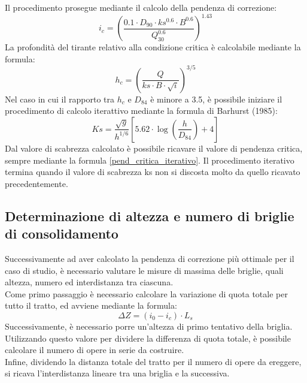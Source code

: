 Il procedimento prosegue mediante il calcolo della pendenza di correzione:
\begin{equation}
    i_c = \left(\frac{0.1 \cdot D_{90} \cdot ks^{0.6} \cdot B^{0.6}}{Q^{0.6}_{30}} \right) ^{1.43}
    \label{pend_critica_iterativo}
\end{equation}
La profondità del tirante relativo alla condizione critica è calcolabile mediante la formula:
\begin{equation}
    h_c = \left( \frac{Q}{ks \cdot B \cdot \sqrt{i}}\right)^{3/5}
\end{equation}
Nel caso in cui il rapporto tra $h_c$ e $D_{84}$ è minore a 3.5, è possibile iniziare il procedimento di calcolo iterattivo mediante la formula di Barhurst (1985):
\begin{equation}
    Ks= \frac{\sqrt{g}}{h^{1/6}} \left[5.62 \cdot \log \left(\frac{h}{D_{84}}\right)+4\right]
    \label{ks_scabrezza_barhurst}
\end{equation}
Dal valore di scabrezza calcolato è possibile ricavare il valore di pendenza critica, sempre mediante la formula \ref{pend_critica_iterativo}. Il procedimento iterativo termina quando il valore di scabrezza ks non si discosta molto da quello ricavato precedentemente.

\subsection{Determinazione di altezza e numero di briglie di consolidamento}
Successivamente ad aver calcolato la pendenza di correzione più ottimale per il caso di studio, è necessario valutare le misure di massima delle briglie, quali altezza, numero ed interdistanza tra ciascuna.\\
Come primo passaggio è necessario calcolare la variazione di quota totale per tutto il tratto, ed avviene mediante la formula:
\begin{equation}
    \Delta Z = (i_0 - i_c) \cdot L_s
\end{equation}
Successivamente, è necessario porre un'altezza di primo tentativo della briglia. Utilizzando questo valore per dividere la differenza di quota totale, è possibile calcolare il numero di opere in serie da costruire.\\
Infine, dividendo la distanza totale del tratto per il numero di opere da ereggere, si ricava l'interdistanza lineare tra una briglia e la successiva.

